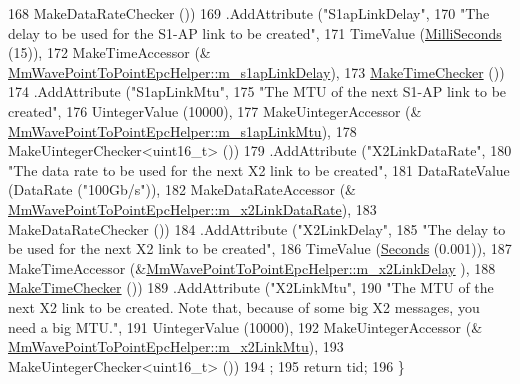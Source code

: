 \begin{DoxyCode}
168                    MakeDataRateChecker ())
169     .AddAttribute (\textcolor{stringliteral}{"S1apLinkDelay"}, 
170                    \textcolor{stringliteral}{"The delay to be used for the S1-AP link to be created"},
171                    TimeValue (\hyperlink{group__timecivil_gaf26127cf4571146b83a92ee18679c7a9}{MilliSeconds} (15)),
172                    MakeTimeAccessor (&
      \hyperlink{classns3_1_1MmWavePointToPointEpcHelper_a1fe106e13b5ec03c2e14d91abff84f7e}{MmWavePointToPointEpcHelper::m\_s1apLinkDelay}),
173                    \hyperlink{group__time_ga7032965bd4afa578691d88c09e4481c1}{MakeTimeChecker} ())
174     .AddAttribute (\textcolor{stringliteral}{"S1apLinkMtu"}, 
175                    \textcolor{stringliteral}{"The MTU of the next S1-AP link to be created"},
176                    UintegerValue (10000),
177                    MakeUintegerAccessor (&
      \hyperlink{classns3_1_1MmWavePointToPointEpcHelper_a5c9ee81e5708d30dc59e1f66bcfe226b}{MmWavePointToPointEpcHelper::m\_s1apLinkMtu}),
178                    MakeUintegerChecker<uint16\_t> ())
179     .AddAttribute (\textcolor{stringliteral}{"X2LinkDataRate"},
180                    \textcolor{stringliteral}{"The data rate to be used for the next X2 link to be created"},
181                    DataRateValue (DataRate (\textcolor{stringliteral}{"100Gb/s"})),
182                    MakeDataRateAccessor (&
      \hyperlink{classns3_1_1MmWavePointToPointEpcHelper_a00fbca1c04f854302d9ff643b24b7c57}{MmWavePointToPointEpcHelper::m\_x2LinkDataRate}),
183                    MakeDataRateChecker ())
184     .AddAttribute (\textcolor{stringliteral}{"X2LinkDelay"},
185                    \textcolor{stringliteral}{"The delay to be used for the next X2 link to be created"},
186                    TimeValue (\hyperlink{group__timecivil_ga33c34b816f8ff6628e33d5c8e9713b9e}{Seconds} (0.001)),
187                    MakeTimeAccessor (&\hyperlink{classns3_1_1MmWavePointToPointEpcHelper_ae014d27a362f6edb9c82405d2fd35e98}{MmWavePointToPointEpcHelper::m\_x2LinkDelay}
      ),
188                    \hyperlink{group__time_ga7032965bd4afa578691d88c09e4481c1}{MakeTimeChecker} ())
189     .AddAttribute (\textcolor{stringliteral}{"X2LinkMtu"},
190                    \textcolor{stringliteral}{"The MTU of the next X2 link to be created. Note that, because of some big X2 messages,
       you need a big MTU."},
191                    UintegerValue (10000),
192                    MakeUintegerAccessor (&
      \hyperlink{classns3_1_1MmWavePointToPointEpcHelper_a51de907fdf82a42d7ce14aac988255b3}{MmWavePointToPointEpcHelper::m\_x2LinkMtu}),
193                    MakeUintegerChecker<uint16\_t> ())
194   ;
195   \textcolor{keywordflow}{return} tid;
196 \}
\end{DoxyCode}


